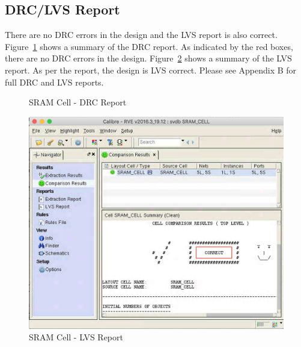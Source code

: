 \documentclass[10pt,letterpaper,onecolumn]{article}
\begin{document}
\subsection{DRC/LVS Report}
There are no DRC errors in the design and the LVS report is also correct. Figure~\ref{fig:DRC_Report} shows a summary of the DRC report. As indicated by the red boxes, there are no DRC errors in the design. Figure~\ref{fig:LVS_Report} shows a summary of the LVS report. As per the report, the design is LVS correct. Please see Appendix B for full DRC and LVS reports.\\
\begin{figure}[htp]
    \centering
    \caption{SRAM Cell - DRC Report}
    \label{fig:DRC_Report}
\end{figure}

\begin{figure}[htp]
    \centering
    \includegraphics[clip,width=0.6\columnwidth]{LVS_Report.png}
    \caption{SRAM Cell - LVS Report}
    \label{fig:LVS_Report}
\end{figure}
\end{document}

